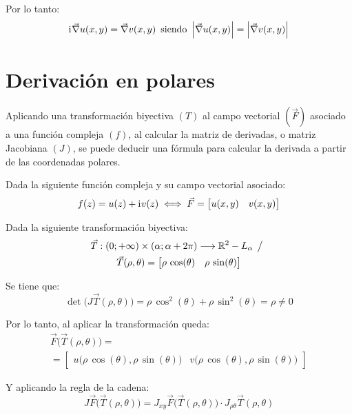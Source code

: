 \documentclass[a5paper,12pt,twoside]{book}
\begin{document}
Por lo tanto:
\begin{equation*}
    \mathrm{i}\mkern1mu \Vec{\nabla} u(x,y) = \Vec{\nabla} v(x,y) \enspace \textrm{siendo} \enspace {\left| {\Vec{\nabla}u(x,y)} \right|} = {\left| {\Vec{\nabla} v(x,y)} \right|}
\end{equation*}


\section{Derivación en polares}

Aplicando una transformación biyectiva $(T)$ al campo vectorial $(\Vec{F})$ asociado a una función compleja $(f)$, al calcular la matriz de derivadas, o matriz Jacobiana $(J)$, se puede deducir una fórmula para calcular la derivada a partir de las coordenadas polares.

Dada la siguiente función compleja y su campo vectorial asociado:
\begin{equation*}
    f(z) = u(z) + \mathrm{i}\mkern1mu v(z) \iff \Vec{F} = \begin{bmatrix} u(x,y) & v(x,y) \end{bmatrix}
\end{equation*}

Dada la siguiente transformación biyectiva:
\begin{multline*}
    \Vec{T}: (0;+\infty) \times (\alpha;\alpha+2\pi) \longrightarrow \mathbb{R}^2 - L_\alpha \hspace{1ex} \big/ \hspace{1ex}
    \\
    \Vec{T}(\rho,\theta) = \begin{bmatrix} \rho \, \cos(\theta) & \rho \, \sin(\theta) \end{bmatrix}
\end{multline*}

Se tiene que:
\begin{equation*}
    \operatorname{det} \big( J \Vec{T}(\rho,\theta) \big) = \rho \, \cos^2(\theta) + \rho \, \sin^2(\theta) = \rho \neq 0
\end{equation*}

Por lo tanto, al aplicar la transformación queda:
\begin{multline*}
    \Vec{F} \Big( \Vec{T}(\rho,\theta) \Big) =
    \\
    = \begin{bmatrix} u \Big( \rho \, \cos{(\theta)} , \rho \, \sin(\theta) \Big) & v \Big( \rho \, \cos(\theta) , \rho \, \sin(\theta) \Big) \end{bmatrix}
\end{multline*}

Y aplicando la regla de la cadena:
\begin{equation*}
    J \Vec{F} \Big( \Vec{T}(\rho,\theta) \Big) = J_{xy} \Vec{F} \Big( \Vec{T}(\rho,\theta) \Big) \cdot J_{\rho\theta} \Vec{T}(\rho,\theta)
\end{equation*}
\end{document}

